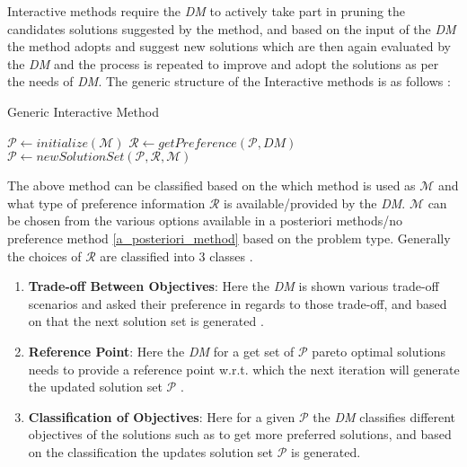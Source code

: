 Interactive methods require the \textit{DM} to actively take part in pruning the candidates solutions suggested by the method, and based on the input of the \textit{DM} the method adopts and suggest new solutions which are then again evaluated by the \textit{DM} and the process is repeated to improve and adopt the solutions as per the needs of \textit{DM}.
\newline\newline The generic structure of the Interactive methods is as follows \cite{miettinen2008introduction}:
\begin{algorithm}[H]
\caption{Generic Interactive Method} \label{algo_generic_interactive_method}
\begin{algorithmic}[1]
\State $\mathcal{P} \gets initialize(\mathcal{M})$ 
\Do
    \State $\mathcal{R} \gets getPreference(\mathcal{P},DM)$
    \State $\mathcal{P} \gets newSolutionSet(\mathcal{P},\mathcal{R},\mathcal{M})$
\end{algorithmic}
\end{algorithm} The above method can be classified based on the which method is used as $\mathcal{M}$ and what type of preference information $\mathcal{R}$ is available/provided by the \textit{DM}.
\newline \newline $\mathcal{M}$ can be chosen from the various options available in a posteriori methods/no preference method \ref{a_posteriori_method} based on the problem type.
\newline \newline Generally the choices of $\mathcal{R}$ are classified into 3 classes \cite{miettinen2008introduction}.
\begin{enumerate}
    \item \textbf{Trade-off Between Objectives}: Here the \textit{DM} is shown various trade-off scenarios and asked their preference in regards to those trade-off, and based on that the next solution set is generated \cite{zionts1976interactive}.
    \item \textbf{Reference Point}: Here the \textit{DM} for a get set of $\mathcal{P}$ pareto optimal solutions needs to provide a reference point w.r.t. which the next iteration will generate the updated solution set  $\mathcal{P}$ \cite{wierzbicki1986completeness}\cite{wierzbicki2000modern}.
    \item \textbf{Classification of Objectives}: Here for a given $\mathcal{P}$ the \textit{DM} classifies different objectives of the solutions such as to get more preferred solutions, and based on the classification the updates solution set $\mathcal{P}$ is generated.
\end{enumerate}

